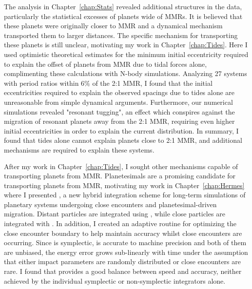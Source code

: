 The analysis in Chapter~\ref{chap:Stats} revealed additional structures in the \kep data, particularly the statistical excesses of planets wide of MMRs.
It is believed that these planets were originally closer to MMR and a dynamical mechanism transported them to larger distances.
The specific mechanism for transporting these planets is still unclear, motivating my work in Chapter~\ref{chap:Tides}.
Here I used optimistic theoretical estimates for the minimum initial eccentricity required to explain the offset of \kep planets from MMR due to tidal forces alone, complimenting these calculations with N-body simulations.
Analyzing 27 \kep systems with period ratios within $6\%$ of the 2:1 MMR, I found that the initial eccentricities required to explain the observed spacings due to tides alone are unreasonable from simple dynamical arguments.
Furthermore, our numerical simulations revealed "resonant tugging", an effect which conspires against the migration of resonant planets away from the 2:1 MMR, requiring even higher initial eccentricities in order to explain the current \kep distribution. 
In summary, I found that tides alone cannot explain planets close to 2:1 MMR, and additional mechanisms are required to explain these systems. 

After my work in Chapter~\ref{chap:Tides}, I sought other mechanisms capable of transporting planets from MMR. 
Planetesimals are a promising candidate for transporting planets from MMR, motivating my work in Chapter~\ref{chap:Hermes} where I presented \hermes, a new hybrid integration scheme for long-term simulations of planetary systems undergoing close encounters and planetesimal-driven migration. 
Distant particles are integrated using \whfast, while close particles are integrated with \ias.
In addition, I created an adaptive routine for optimizing the close encounter boundary to help maintain accuracy whilst close encounters are occurring.
Since \whfast is symplectic, \ias is accurate to machine precision and both of them are unbiased, the energy error grows sub-linearly with time under the assumption that either impact parameters are randomly distributed or close encounters are rare.
I found that \hermes provides a good balance between speed and accuracy, neither achieved by the individual symplectic or non-symplectic integrators alone.


